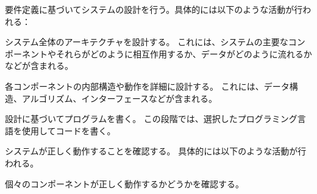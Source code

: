 要件定義に基づいてシステムの設計を行う。具体的には以下のような活動が行われる：



システム全体のアーキテクチャを設計する。
これには、システムの主要なコンポーネントやそれらがどのように相互作用するか、データがどのように流れるかなどが含まれる。



各コンポーネントの内部構造や動作を詳細に設計する。
これには、データ構造、アルゴリズム、インターフェースなどが含まれる。




設計に基づいてプログラムを書く。
この段階では、選択したプログラミング言語を使用してコードを書く。




システムが正しく動作することを確認する。
具体的には以下のような活動が行われる。



個々のコンポーネントが正しく動作するかどうかを確認する。



